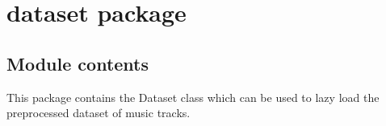 \documentclass[letterpaper,10pt,english,openany,oneside]{sphinxmanual}
\begin{document}
\begin{fulllineitems}
\begin{fulllineitems}
\label{\detokenize{docs/source/config:config.TRAIN_CONFIG.STEPS}}
\end{fulllineitems}


\begin{fulllineitems}
\label{\detokenize{docs/source/config:config.TRAIN_CONFIG.TRAINED_ON}}
\end{fulllineitems}


\end{fulllineitems}



\chapter{dataset package}
\label{\detokenize{docs/source/dataset:dataset-package}}\label{\detokenize{docs/source/dataset::doc}}

\section{Module contents}
\label{\detokenize{docs/source/dataset:module-dataset}}\label{\detokenize{docs/source/dataset:module-contents}}
This package contains the Dataset class which can be used to lazy load the preprocessed dataset of music tracks.
\end{document}
